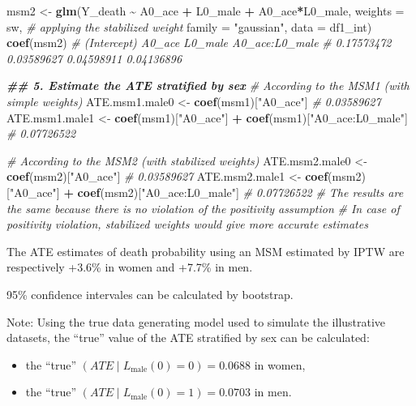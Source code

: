 \documentclass[
]{book}
\newenvironment{Shaded}{\begin{snugshade}}{\end{snugshade}}
\newcommand{\AttributeTok}[1]{\textcolor[rgb]{0.13,0.29,0.53}{#1}}
\newcommand{\CommentTok}[1]{\textcolor[rgb]{0.56,0.35,0.01}{\textit{#1}}}
\newcommand{\DocumentationTok}[1]{\textcolor[rgb]{0.56,0.35,0.01}{\textbf{\textit{#1}}}}
\newcommand{\FunctionTok}[1]{\textcolor[rgb]{0.13,0.29,0.53}{\textbf{#1}}}
\newcommand{\NormalTok}[1]{#1}
\newcommand{\OtherTok}[1]{\textcolor[rgb]{0.56,0.35,0.01}{#1}}
\newcommand{\SpecialCharTok}[1]{\textcolor[rgb]{0.81,0.36,0.00}{\textbf{#1}}}
\newcommand{\StringTok}[1]{\textcolor[rgb]{0.31,0.60,0.02}{#1}}
\begin{document}
\begin{Shaded}
\begin{Highlighting}[]
\NormalTok{msm2 }\OtherTok{\textless{}{-}} \FunctionTok{glm}\NormalTok{(Y\_death }\SpecialCharTok{\textasciitilde{}}\NormalTok{ A0\_ace }\SpecialCharTok{+}\NormalTok{ L0\_male }\SpecialCharTok{+}\NormalTok{ A0\_ace}\SpecialCharTok{*}\NormalTok{L0\_male,}
            \AttributeTok{weights =}\NormalTok{ sw, }\CommentTok{\# applying the stabilized weight}
            \AttributeTok{family =} \StringTok{"gaussian"}\NormalTok{,}
            \AttributeTok{data =}\NormalTok{ df1\_int)}
\FunctionTok{coef}\NormalTok{(msm2)}
\CommentTok{\# (Intercept)         A0\_ace        L0\_male A0\_ace:L0\_male}
\CommentTok{\# 0.17573472     0.03589627     0.04598911     0.04136896}

\DocumentationTok{\#\# 5. Estimate the ATE stratified by sex}
\CommentTok{\# According to the MSM1 (with simple weights)}
\NormalTok{ATE.msm1.male0 }\OtherTok{\textless{}{-}} \FunctionTok{coef}\NormalTok{(msm1)[}\StringTok{"A0\_ace"}\NormalTok{]}
\CommentTok{\# 0.03589627}
\NormalTok{ATE.msm1.male1 }\OtherTok{\textless{}{-}} \FunctionTok{coef}\NormalTok{(msm1)[}\StringTok{"A0\_ace"}\NormalTok{] }\SpecialCharTok{+} \FunctionTok{coef}\NormalTok{(msm1)[}\StringTok{"A0\_ace:L0\_male"}\NormalTok{]}
\CommentTok{\# 0.07726522}

\CommentTok{\# According to the MSM2 (with stabilized weights)}
\NormalTok{ATE.msm2.male0 }\OtherTok{\textless{}{-}} \FunctionTok{coef}\NormalTok{(msm2)[}\StringTok{"A0\_ace"}\NormalTok{]}
\CommentTok{\# 0.03589627}
\NormalTok{ATE.msm2.male1 }\OtherTok{\textless{}{-}} \FunctionTok{coef}\NormalTok{(msm2)[}\StringTok{"A0\_ace"}\NormalTok{] }\SpecialCharTok{+} \FunctionTok{coef}\NormalTok{(msm2)[}\StringTok{"A0\_ace:L0\_male"}\NormalTok{]}
\CommentTok{\# 0.07726522}
\CommentTok{\# The results are the same because there is no violation of the positivity assumption}
\CommentTok{\# In case of positivity violation, stabilized weights would give more accurate estimates}
\end{Highlighting}
\end{Shaded}

The ATE estimates of death probability using an MSM estimated by IPTW are respectively +3.6\% in women and +7.7\% in men.

95\% confidence intervales can be calculated by bootstrap.

Note: Using the true data generating model used to simulate the illustrative datasets, the ``true'' value of the ATE stratified by sex can be calculated:

\begin{itemize}
\item
  the ``true'' \((ATE \mid L_\text{male}(0) = 0) = 0.0688\) in women,
\item
  the ``true'' \((ATE \mid L_\text{male}(0) = 1) = 0.0703\) in men.
\end{itemize}
\end{document}
